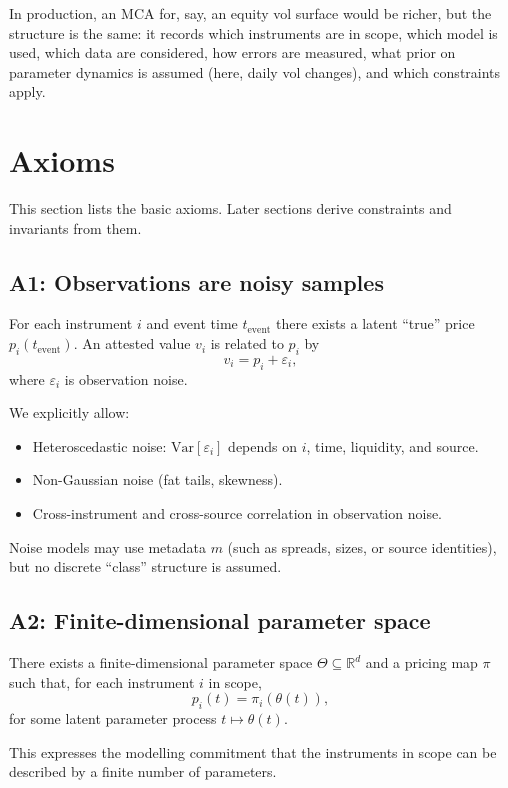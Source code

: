 \documentclass[11pt,a4paper]{article}
\begin{document}
In production, an MCA for, say, an equity vol surface would be richer, but the structure is the same: it records which instruments are in scope, which model is used, which data are considered, how errors are measured, what prior on parameter dynamics is assumed (here, daily vol changes), and which constraints apply.

\section{Axioms}

This section lists the basic axioms. Later sections derive constraints and invariants from them.

\subsection{A1: Observations are noisy samples}

For each instrument $i$ and event time $t_{\text{event}}$ there exists a latent ``true'' price $p_i(t_{\text{event}})$. An attested value $v_i$ is related to $p_i$ by
\[
    v_i = p_i + \varepsilon_i,
\]
where $\varepsilon_i$ is observation noise.

We explicitly allow:
\begin{itemize}
    \item Heteroscedastic noise: $\text{Var}[\varepsilon_i]$ depends on $i$, time, liquidity, and source.
    \item Non-Gaussian noise (fat tails, skewness).
    \item Cross-instrument and cross-source correlation in observation noise.
\end{itemize}

Noise models may use metadata $m$ (such as spreads, sizes, or source identities), but no discrete ``class'' structure is assumed.

\subsection{A2: Finite-dimensional parameter space}

There exists a finite-dimensional parameter space $\Theta \subseteq \mathbb{R}^d$ and a pricing map $\pi$ such that, for each instrument $i$ in scope,
\[
    p_i(t) = \pi_i(\theta(t)),
\]
for some latent parameter process $t \mapsto \theta(t)$.

This expresses the modelling commitment that the instruments in scope can be described by a finite number of parameters.
\end{document}
